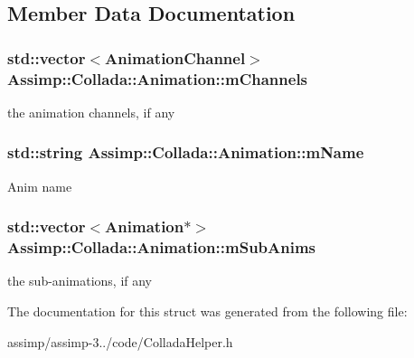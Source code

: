 \subsection{Member Data Documentation}
\hypertarget{struct_assimp_1_1_collada_1_1_animation_a606cbd98c5f0b9c939792500797a8f12}{
\subsubsection[{m\+Channels}]{\setlength{\rightskip}{0pt plus 5cm}std\+::vector$<${\bf Animation\+Channel}$>$ Assimp\+::\+Collada\+::\+Animation\+::m\+Channels}}\label{struct_assimp_1_1_collada_1_1_animation_a606cbd98c5f0b9c939792500797a8f12}
the animation channels, if any \hypertarget{struct_assimp_1_1_collada_1_1_animation_a1a8adf4fd345549579d6c86ad6e76ced}{
\subsubsection[{m\+Name}]{\setlength{\rightskip}{0pt plus 5cm}std\+::string Assimp\+::\+Collada\+::\+Animation\+::m\+Name}}\label{struct_assimp_1_1_collada_1_1_animation_a1a8adf4fd345549579d6c86ad6e76ced}
Anim name \hypertarget{struct_assimp_1_1_collada_1_1_animation_a2606498598961cda77c034521fd8e11c}{
\subsubsection[{m\+Sub\+Anims}]{\setlength{\rightskip}{0pt plus 5cm}std\+::vector$<${\bf Animation}$\ast$$>$ Assimp\+::\+Collada\+::\+Animation\+::m\+Sub\+Anims}}\label{struct_assimp_1_1_collada_1_1_animation_a2606498598961cda77c034521fd8e11c}
the sub-\/animations, if any 

The documentation for this struct was generated from the following file\+:\begin{DoxyCompactItemize}
\item 
assimp/assimp-\/3../code/Collada\+Helper.\+h\end{DoxyCompactItemize}
